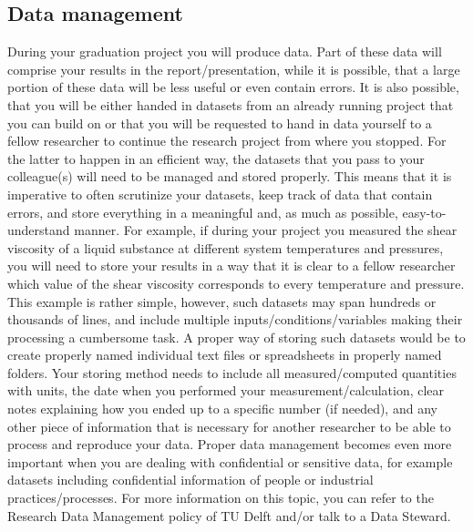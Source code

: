 \documentclass{article}
\begin{document}
\subsection{Data management}
During your graduation project you will produce data. Part of these data will comprise your results in the report/presentation, while it is possible, that a large portion of these data will be less useful or even contain errors. It is also possible, that you will be either handed in datasets from an already running project that you can build on or that you will be requested to hand in data yourself to a fellow researcher to continue the research project from where you stopped. For the latter to happen in an efficient way, the datasets that you pass to your colleague(s) will need to be managed and stored properly. This means that it is imperative to often scrutinize your datasets, keep track of data that contain errors, and store everything in a meaningful and, as much as possible, easy-to-understand manner. For example, if during your project you measured the shear viscosity of a liquid substance at different system temperatures and pressures, you will need to store your results in a way that it is clear to a fellow researcher which value of the shear viscosity corresponds to every temperature and pressure. This example is rather simple, however, such datasets may span hundreds or thousands of lines, and include multiple inputs/conditions/variables making their processing a cumbersome task. A proper way of storing such datasets would be to create properly named individual text files or spreadsheets in properly named folders. Your storing method needs to include all measured/computed quantities with units, the date when you performed your measurement/calculation, clear notes explaining how you ended up to a specific number (if needed), and any other piece of information that is necessary for another researcher to be able to process and reproduce your data. Proper data management becomes even more important when you are dealing with confidential or sensitive data, for example datasets including confidential information of people or industrial practices/processes. For more information on this topic, you can refer to the Research Data Management policy of TU Delft and/or talk to a Data Steward.
\end{document}
